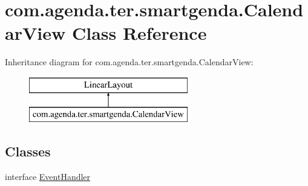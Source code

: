 \hypertarget{classcom_1_1agenda_1_1ter_1_1smartgenda_1_1_calendar_view}{\section{com.\-agenda.\-ter.\-smartgenda.\-Calendar\-View Class Reference}
\label{classcom_1_1agenda_1_1ter_1_1smartgenda_1_1_calendar_view}
}
Inheritance diagram for com.\-agenda.\-ter.\-smartgenda.\-Calendar\-View\-:\begin{figure}[H]
\begin{center}
\leavevmode
\includegraphics[height=2.000000cm]{classcom_1_1agenda_1_1ter_1_1smartgenda_1_1_calendar_view}
\end{center}
\end{figure}
\subsection*{Classes}
\begin{DoxyCompactItemize}
\item 
interface \hyperlink{interfacecom_1_1agenda_1_1ter_1_1smartgenda_1_1_calendar_view_1_1_event_handler}{Event\-Handler}
\end{DoxyCompactItemize}
